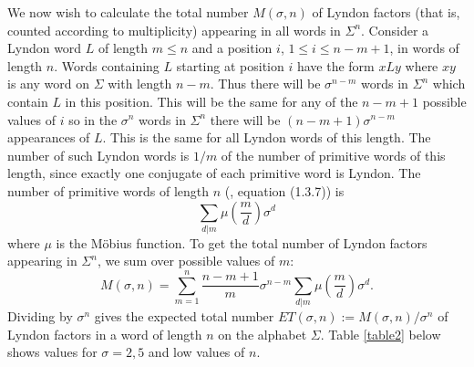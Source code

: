 \documentclass[11pt]{amsart}
\newcommand{\1}{\bar{1}}
\theoremstyle{plain}
\theoremstyle{definition}
\theoremstyle{remark}
\begin{document}
We now wish to calculate the total number $M(\sigma,n)$ of Lyndon factors (that is, counted according to multiplicity) appearing in all words in $\Sigma^n$. Consider a Lyndon word $L$ of length $m \le n$ and a position $i$, $1 \le i \le n-m+1$, in words of length $n$. Words containing $L$ starting at position $i$ have the form $xLy$ where $xy$ is any word on $\Sigma$ with length $n-m$. Thus there will be $\sigma^{n-m}$ words in $\Sigma^n$ which contain $L$ in this position. This will be the same for any of the $n-m+1$ possible values of $i$ so in the $\sigma^n$ words in $\Sigma^n$ there will be $(n-m+1)\sigma^{n-m}$ appearances of $L$. This is the same for all Lyndon words of this length.  The number of such Lyndon words is $1/m$ of the number of primitive words of this length, since exactly one conjugate of each primitive word is Lyndon.  The number of primitive words of length $n$ (\cite{L1}, equation (1.3.7)) is
\[
\sum_{d | m} \mu\left(\frac{m}{d}\right) \sigma^d
\]
where $\mu$ is the M\"{o}bius function.  To get the total number of Lyndon factors appearing in $\Sigma^n$,
we sum over possible values of $m$:
\begin{equation}
M(\sigma,n) = \sum_{m=1}^n \frac{n-m+1}{m} \sigma^{n-m}\sum_{d | m} \mu\left(\frac{m}{d}\right) \sigma^d.
\end{equation}
Dividing by $\sigma^n$ gives the expected total number
$ET(\sigma,n) := M(\sigma,n)/\sigma^n$ of Lyndon factors
in a word of length $n$ on the alphabet $\Sigma$.
Table \ref{table2} below shows values for $\sigma=2,5$ and low values of $n$.
\end{document}
